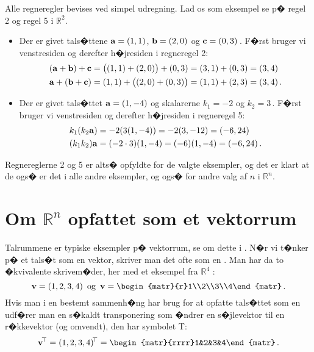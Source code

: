 \begin{bevis}
Alle regneregler bevises ved simpel udregning. Lad os som eksempel se p� regel 2 og regel 5 i $\mathbb R ^2$.
\begin{itemize}
\item
Der er givet tals�ttene $\mathbf{a}=(1,1)$, $\mathbf{b}=(2,0)$ og $\mathbf{c}=(0,3)\,$. F�rst bruger vi venstresiden og derefter h�jresiden i regneregel 2:
\begin{align*}
(\mathbf{a} + \mathbf{b}) + \mathbf{c}&=\big((1,1)+(2,0)\big)+(0,3)=(3,1)+(0,3)=(3,4)\\
\mathbf{a} + (\mathbf{b} + \mathbf{c})&=(1,1)+\big((2,0)+(0,3)\big)=(1,1)+(2,3)=(3,4)\,.
\end{align*}
\item
Der er givet tals�ttet $\mathbf{a}=(1,-4)$ og skalarerne $k_1 = -2$ og $k_2 = 3\,$. F�rst bruger vi venstresiden og derefter h�jresiden i regneregel 5:
\begin{align*}
k_1(k_2\mathbf{a})&= -2(3(1,-4))=-2(3,-12)=(-6,24)\\
(k_1k_2)\mathbf{a}&=(-2\cdot 3)(1,-4)=(-6)(1,-4)=(-6,24)\,.
\end{align*}
\end{itemize}
Regnereglerne 2 og 5 er alts� opfyldte for de valgte eksempler, og det er klart at de ogs� er det i alle andre eksempler, og ogs� for andre valg af $n$ i $\mathbb R ^n$.
\end{bevis}

\section{Om $\mathbb R^n $ opfattet som et vektorrum}
Talrummene er typiske eksempler p� vektorrum, se om dette i . N�r vi t�nker p� et tals�t som en vektor, skriver man det ofte som en . Man har da to �kvivalente skrivem�der, her med et eksempel fra $\mathbb R^4$ :
$$\mv=(1,2,3,4)\,\,\,\mathrm{og}\,\,\,
\mv=\begin{matr}{r}1\\2\\3\\4\end{matr}\,.$$
Hvis man i en bestemt sammenh�ng har brug for at opfatte tals�ttet som en  udf�rer man en s�kaldt transponering som �ndrer en s�jlevektor til en r�kkevektor (og omvendt), den har symbolet T:
$$\mv\transp =(1,2,3,4)\transp=
\begin{matr}{rrrr}1&2&3&4\end{matr}\,.$$







 